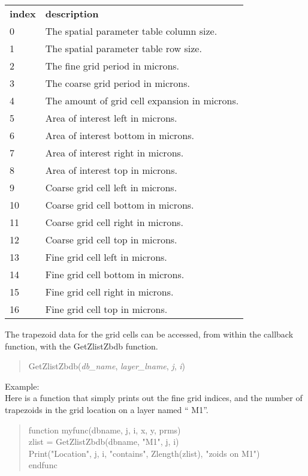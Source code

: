 \begin{description}
\begin{tabular}{ll}
\bf index & \bf description\\
0 & The spatial parameter table column size.\\
1 & The spatial parameter table row size.\\
2 & The fine grid period in microns.\\
3 & The coarse grid period in microns.\\
4 & The amount of grid cell expansion in microns.\\
5 & Area of interest left in microns.\\
6 & Area of interest bottom in microns.\\
7 & Area of interest right in microns.\\
8 & Area of interest top in microns.\\
9 & Coarse grid cell left in microns.\\
10 & Coarse grid cell bottom in microns.\\
11 & Coarse grid cell right in microns.\\
12 & Coarse grid cell top in microns.\\
13 & Fine grid cell left in microns.\\
14 & Fine grid cell bottom in microns.\\
15 & Fine grid cell right in microns.\\
16 & Fine grid cell top in microns.\\
\end{tabular}

The trapezoid data for the grid cells can be accessed, from within the
callback function, with the {\vt GetZlistZbdb} function.
\begin{quote}
{\vt GetZlistZbdb}({\it db\_name\/}, {\it layer\_lname\/}, {\it j\/},
{\it i\/})
\end{quote}

Example:\\
Here is a function that simply prints out the fine grid indices, and
the number of trapezoids in the grid location on a layer named ``{\vt
M1}''.
\begin{quote}\vt
function myfunc(dbname, j, i, x, y, prms)\\
\hspace*{2em}zlist = GetZlistZbdb(dbname, "M1", j, i)\\
\hspace*{2em}Print("Location", j, i, "contains", Zlength(zlist),
 "zoids on M1")\\
endfunc
\end{quote}


\end{description}
